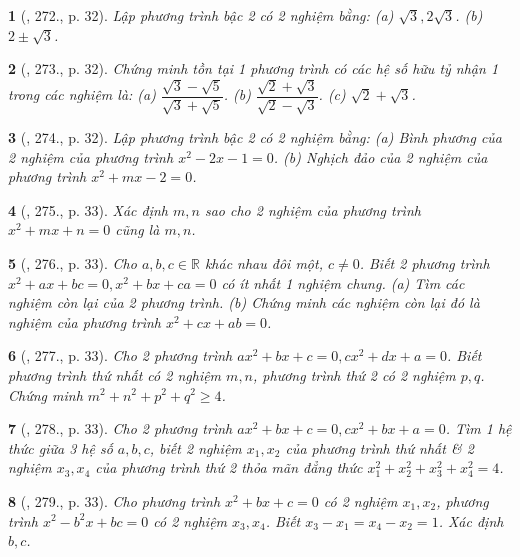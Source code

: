 \documentclass{article}
\newtheorem{baitoan}{}
\begin{document}
\begin{baitoan}[\cite{Binh_Toan_9_tap_2}, 272., p. 32]
	Lập phương trình bậc 2 có 2 nghiệm bằng: (a) $\sqrt{3},2\sqrt{3}$. (b) $2\pm\sqrt{3}$.
\end{baitoan}

\begin{baitoan}[\cite{Binh_Toan_9_tap_2}, 273., p. 32]
	Chứng minh tồn tại 1 phương trình có các hệ số hữu tỷ nhận 1 trong các nghiệm là: (a) $\dfrac{\sqrt{3} - \sqrt{5}}{\sqrt{3} + \sqrt{5}}$. (b) $\dfrac{\sqrt{2} + \sqrt{3}}{\sqrt{2} - \sqrt{3}}$. (c) $\sqrt{2} + \sqrt{3}$.
\end{baitoan}

\begin{baitoan}[\cite{Binh_Toan_9_tap_2}, 274., p. 32]
	Lập phương trình bậc 2 có 2 nghiệm bằng: (a) Bình phương của 2 nghiệm của phương trình $x^2 - 2x - 1 = 0$. (b) Nghịch đảo của 2 nghiệm của phương trình $x^2 + mx - 2 = 0$.
\end{baitoan}

\begin{baitoan}[\cite{Binh_Toan_9_tap_2}, 275., p. 33]
	Xác định $m,n$ sao cho 2 nghiệm của phương trình $x^2 + mx + n = 0$ cũng là $m,n$.
\end{baitoan}

\begin{baitoan}[\cite{Binh_Toan_9_tap_2}, 276., p. 33]
	Cho $a,b,c\in\mathbb{R}$ khác nhau đôi một, $c\ne0$. Biết 2 phương trình $x^2 + ax + bc = 0,x^2 + bx + ca = 0$ có ít nhất 1 nghiệm chung. (a) Tìm các nghiệm còn lại của 2 phương trình. (b) Chứng minh các nghiệm còn lại đó là nghiệm của phương trình $x^2 + cx + ab = 0$.
\end{baitoan}

\begin{baitoan}[\cite{Binh_Toan_9_tap_2}, 277., p. 33]
	Cho 2 phương trình $ax^2 + bx + c = 0,cx^2 + dx + a = 0$. Biết phương trình thứ nhất có 2 nghiệm $m,n$, phương trình thứ 2 có 2 nghiệm $p,q$. Chứng minh $m^2 + n^2 + p^2 + q^2\ge4$.
\end{baitoan}

\begin{baitoan}[\cite{Binh_Toan_9_tap_2}, 278., p. 33]
	Cho 2 phương trình $ax^2 + bx + c = 0,cx^2 + bx + a = 0$. Tìm 1 hệ thức giữa 3 hệ số $a,b,c$, biết 2 nghiệm $x_1,x_2$ của phương trình thứ nhất \& 2 nghiệm $x_3,x_4$ của phương trình thứ 2 thỏa mãn đẳng thức $x_1^2 + x_2^2 + x_3^2 + x_4^2 = 4$.
\end{baitoan}

\begin{baitoan}[\cite{Binh_Toan_9_tap_2}, 279., p. 33]
	Cho phương trình $x^2 + bx + c = 0$ có 2 nghiệm $x_1,x_2$, phương trình $x^2 - b^2x + bc = 0$ có 2 nghiệm $x_3,x_4$. Biết $x_3 - x_1 = x_4 - x_2 = 1$. Xác định $b,c$.
\end{baitoan}
\end{document}
